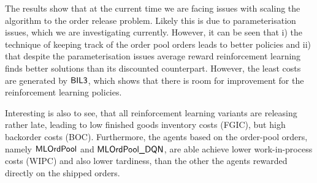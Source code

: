 \documentclass[envcountsame]{llncs}
\begin{document}
The results show that at the current time we are facing issues with scaling the algorithm to the
order release problem. Likely this is due to parameterisation issues, which we are investigating
currently. However, it can be seen that i) the technique of keeping track of the order pool orders
leads to better policies and ii) that despite the parameterisation issues average reward
reinforcement learning finds better solutions than its discounted counterpart. However, the least
costs are generated by \(\textsf{BIL3}\), which shows that there is room for improvement for the
reinforcement learning policies.

Interesting is also to see, that all reinforcement learning variants are releasing rather late,
leading to low finished goods inventory costs (FGIC), but high backorder costs (BOC). Furthermore,
the agents based on the order-pool orders, namely \(\textsf{MLOrdPool}\) and \(\textsf{MLOrdPool\_DQN}\), are able
achieve lower work-in-process costs (WIPC) and also lower tardiness, than the other the agents
rewarded directly on the shipped orders.
\end{document}
